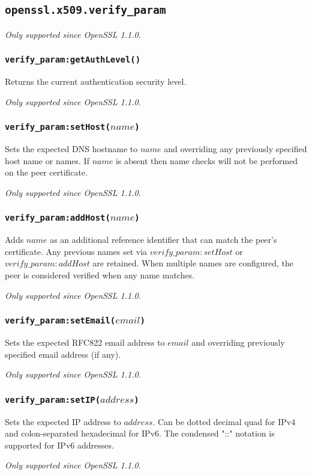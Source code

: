\documentclass[11pt, oneside]{memoir}
\newcommand*{\fn}[1]{\texttt{#1}\xspace}
\newcounter{toccols}
\newenvironment{Module}[1]{
	\subsection{\texttt{#1}}
	\addtocontents{toc}{
		\protect\begin{multicols}{\value{toccols}}
	}
}{
	\addtocontents{toc}{\protect\end{multicols}}
}
\begin{document}
\begin{Module}{openssl.x509.verify\_param}
\emph{Only supported since OpenSSL 1.1.0.}

\subsubsection[\fn{verify\_param:getAuthLevel}]{\fn{verify\_param:getAuthLevel()}}

Returns the current authentication security level.

\emph{Only supported since OpenSSL 1.1.0.}

\subsubsection[\fn{verify\_param:setHost}]{\fn{verify\_param:setHost($name$)}}

Sets the expected DNS hostname to $name$ and overriding any previously specified host name or names. If $name$ is absent then name checks will not be performed on the peer certificate.

\emph{Only supported since OpenSSL 1.1.0.}

\subsubsection[\fn{verify\_param:addHost}]{\fn{verify\_param:addHost($name$)}}

Adds $name$ as an additional reference identifier that can match the peer's certificate. Any previous names set via $verify\_param:setHost$ or $verify\_param:addHost$ are retained. When multiple names are configured, the peer is considered verified when any name matches.

\emph{Only supported since OpenSSL 1.1.0.}

\subsubsection[\fn{verify\_param:setEmail}]{\fn{verify\_param:setEmail($email$)}}

Sets the expected RFC822 email address to $email$ and overriding previously specified email address (if any).

\emph{Only supported since OpenSSL 1.1.0.}

\subsubsection[\fn{verify\_param:setIP}]{\fn{verify\_param:setIP($address$)}}

Sets the expected IP address to $address$. Can be dotted decimal quad for IPv4 and colon-separated hexadecimal for IPv6. The condensed "::" notation is supported for IPv6 addresses.

\emph{Only supported since OpenSSL 1.1.0.}

\end{Module}
\end{document}
